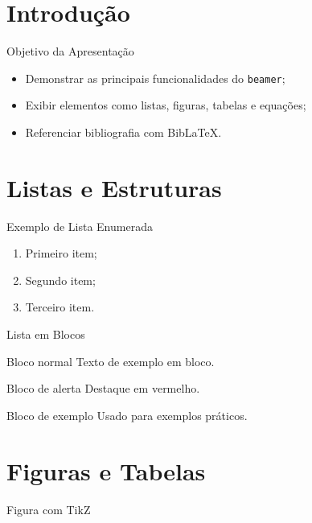 \section{Introdução}

\begin{frame}{Objetivo da Apresentação}
    \begin{itemize}
        \item Demonstrar as principais funcionalidades do \texttt{beamer};
        \item Exibir elementos como listas, figuras, tabelas e equações;
        \item Referenciar bibliografia com Bib\LaTeX{}.
    \end{itemize}
\end{frame}

\section{Listas e Estruturas}

\begin{frame}{Exemplo de Lista Enumerada}
    \begin{enumerate}
        \item Primeiro item;
        \item Segundo item;
        \item Terceiro item.
    \end{enumerate}
\end{frame}

\begin{frame}{Lista em Blocos}
    \begin{block}{Bloco normal}
        Texto de exemplo em bloco.
    \end{block}
    \begin{alertblock}{Bloco de alerta}
        Destaque em vermelho.
    \end{alertblock}
    \begin{exampleblock}{Bloco de exemplo}
        Usado para exemplos práticos.
    \end{exampleblock}
\end{frame}

\section{Figuras e Tabelas}

\begin{frame}{Figura com TikZ}
    \centering
\end{frame}

